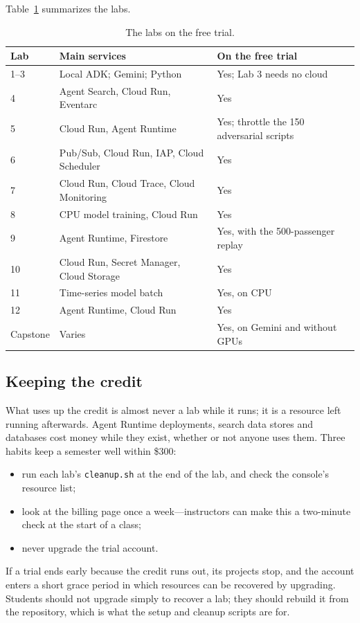 Table~\ref{tab:trial-labs} summarizes the labs.

\begin{table}[htbp]
\centering
\small
\caption{The labs on the free trial.}
\label{tab:trial-labs}
\begin{tabularx}{\textwidth}{@{}l>{\raggedright\arraybackslash}X>{\raggedright\arraybackslash}p{4.4cm}@{}}
\toprule
Lab & Main services & On the free trial \\
\midrule
1--3 & Local ADK; Gemini; Python & Yes; Lab 3 needs no cloud \\
4 & Agent Search, Cloud Run, Eventarc & Yes \\
5 & Cloud Run, Agent Runtime & Yes; throttle the 150 adversarial scripts \\
6 & Pub/Sub, Cloud Run, IAP, Cloud Scheduler & Yes \\
7 & Cloud Run, Cloud Trace, Cloud Monitoring & Yes \\
8 & CPU model training, Cloud Run & Yes \\
9 & Agent Runtime, Firestore & Yes, with the 500-passenger replay \\
10 & Cloud Run, Secret Manager, Cloud Storage & Yes \\
11 & Time-series model batch & Yes, on CPU \\
12 & Agent Runtime, Cloud Run & Yes \\
Capstone & Varies & Yes, on Gemini and without GPUs \\
\bottomrule
\end{tabularx}
\end{table}

\subsection{Keeping the credit}

What uses up the credit is almost never a lab while it runs; it is a resource left running afterwards. Agent Runtime deployments, search data stores and databases cost money while they exist, whether or not anyone uses them. Three habits keep a semester well within \$300:
\begin{itemize}[itemsep=1pt]
  \item run each lab's \texttt{cleanup.sh} at the end of the lab, and check the console's resource list;
  \item look at the billing page once a week---instructors can make this a two-minute check at the start of a class;
  \item never upgrade the trial account.
\end{itemize}
If a trial ends early because the credit runs out, its projects stop, and the account enters a short grace period in which resources can be recovered by upgrading. Students should not upgrade simply to recover a lab; they should rebuild it from the repository, which is what the setup and cleanup scripts are for.

